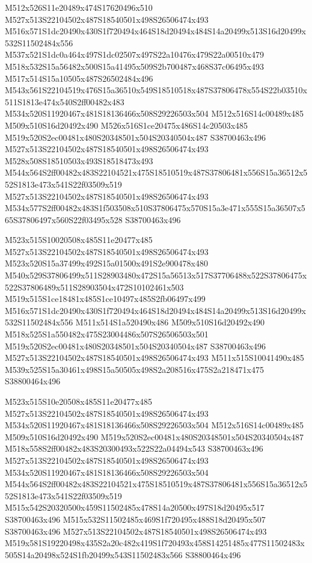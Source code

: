 \documentclass{article}
\begin{document}
\begin{multicols}{2}
M512x526S11e20489x474S17620496x510 M527x513S22104502x487S18540501x498S26506474x493 M516x571S1dc20490x430S1f720494x464S18d20494x484S14a20499x513S16d20499x532S11502484x556 M537x521S1dc0a464x497S1dc02507x497S22a10476x479S22a00510x479 M518x532S15a56482x500S15a41495x509S2b700487x468S37c06495x493 M517x514S15a10505x487S26502484x496 M543x561S22104519x476S15a36510x549S18510518x487S37806478x554S22b03510x511S1813e474x540S2ff00482x483 M534x520S11920467x481S18136466x508S29226503x504 M512x516S14c00489x485 M509x510S16d20492x490 M526x516S1ce20475x486S14c20503x485 M519x520S2ec00481x480S20348501x504S20340504x487 S38700463x496 M527x513S22104502x487S18540501x498S26506474x493 M528x508S18510503x493S18518473x493 M544x564S2ff00482x483S22104521x475S18510519x487S37806481x556S15a36512x552S1813e473x541S22f03509x519 M527x513S22104502x487S18540501x498S26506474x493 M534x577S2ff00482x483S1f503508x510S37806475x570S15a3e471x555S15a36507x565S37806497x560S22f03495x528 S38700463x496

M523x515S10020508x485S11e20477x485 M527x513S22104502x487S18540501x498S26506474x493 M523x520S15a37499x492S15a01500x491S2e900478x480 M540x529S37806499x511S28903480x472S15a56513x517S37706488x522S37806475x522S37806489x511S28903504x472S10102461x503 M519x515S1ce18481x485S1ce10497x485S2fb06497x499 M516x571S1dc20490x430S1f720494x464S18d20494x484S14a20499x513S16d20499x532S11502484x556 M511x514S1a520490x486 M509x510S16d20492x490 M518x525S1a550482x475S23004486x507S26506503x501 M519x520S2ec00481x480S20348501x504S20340504x487 S38700463x496 M527x513S22104502x487S18540501x498S26506474x493 M511x515S10041490x485 M539x525S15a30461x498S15a50505x498S2a208516x475S2a218471x475 S38800464x496

M523x515S10e20508x485S11e20477x485 M527x513S22104502x487S18540501x498S26506474x493 M534x520S11920467x481S18136466x508S29226503x504 M512x516S14c00489x485 M509x510S16d20492x490 M519x520S2ec00481x480S20348501x504S20340504x487 M518x558S2ff00482x483S20300493x522S22a04494x543 S38700463x496 M527x513S22104502x487S18540501x498S26506474x493 M534x520S11920467x481S18136466x508S29226503x504 M544x564S2ff00482x483S22104521x475S18510519x487S37806481x556S15a36512x552S1813e473x541S22f03509x519 M515x542S20320500x459S11502485x478S14a20500x497S18d20495x517 S38700463x496 M515x532S11502485x469S1f720495x488S18d20495x507 S38700463x496 M527x513S22104502x487S18540501x498S26506474x493 M519x581S19220498x435S2a20c482x419S1f720493x458S14251485x477S11502483x505S14a20498x524S1fb20499x543S11502483x566 S38800464x496


\end{multicols}
\end{document}
